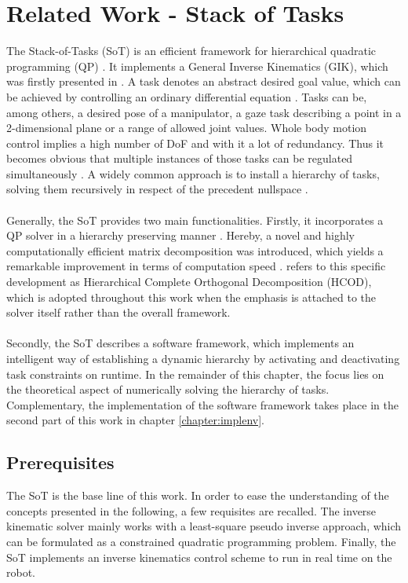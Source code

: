 \chapter{Related Work - Stack of Tasks}
\label{chapter:soth}

The Stack-of-Tasks (SoT) is an efficient framework for hierarchical quadratic programming (QP) \cite{kanoun:itro:11}. It implements a General Inverse Kinematics (GIK), which was firstly presented in \cite{nakamura}. A task denotes an abstract desired goal value, which can be achieved by controlling an ordinary differential equation \cite{ROB:2555180}. Tasks can be, among others, a desired pose of a manipulator, a gaze task describing a point in a 2-dimensional plane or a range of allowed joint values. Whole body motion control implies a high number of DoF and with it a lot of redundancy. Thus it becomes obvious that multiple instances of those tasks can be regulated simultaneously \cite{Liegeois1977}. A widely common approach is to install a hierarchy of tasks, solving them recursively in respect of the precedent nullspace \cite{siciliano1991general}.  \\
\\
Generally, the SoT provides two main functionalities. Firstly, it incorporates a QP solver in a hierarchy preserving manner \cite{mansard-tro-09}. Hereby, a novel and highly computationally efficient matrix decomposition was introduced, which yields a remarkable improvement in terms of computation speed \cite{escande-ijrr-sub12}. \cite{escande-icra-10} refers to this specific development as Hierarchical Complete Orthogonal Decomposition (HCOD), which is adopted throughout this work when the emphasis is attached to the solver itself rather than the overall framework.\\
\\
Secondly, the SoT describes a software framework, which implements an intelligent way of establishing a dynamic hierarchy by activating and deactivating task constraints on runtime. In the remainder of this chapter, the focus lies on the theoretical aspect of numerically solving the hierarchy of tasks. Complementary, the implementation of the software framework takes place in the second part of this work in chapter \ref{chapter:implenv}.

\section{Prerequisites}
The SoT is the base line of this work. In order to ease the understanding of the concepts presented in the following, a few requisites are recalled. The inverse kinematic solver mainly works with a least-square pseudo inverse approach, which can be formulated as a constrained quadratic programming problem. Finally, the SoT implements an inverse kinematics control scheme to run in real time on the robot.

